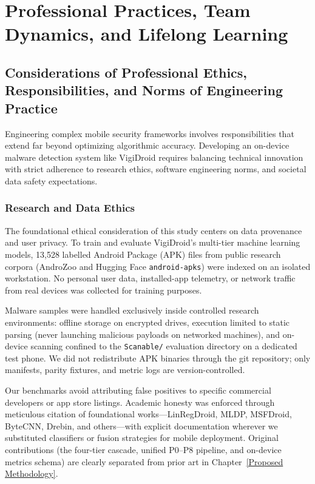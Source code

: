 \chapter{Professional Practices, Team Dynamics, and Lifelong Learning}\label{Ethics}

\section{Considerations of Professional Ethics, Responsibilities, and Norms of Engineering Practice}
Engineering complex mobile security frameworks involves responsibilities that extend far beyond optimizing algorithmic accuracy. Developing an on-device malware detection system like VigiDroid requires balancing technical innovation with strict adherence to research ethics, software engineering norms, and societal data safety expectations.

\subsection{Research and Data Ethics}
The foundational ethical consideration of this study centers on data provenance and user privacy. To train and evaluate VigiDroid's multi-tier machine learning models, 13,528 labelled Android Package (APK) files from public research corpora (AndroZoo and Hugging Face \texttt{android-apks}) were indexed on an isolated workstation. No personal user data, installed-app telemetry, or network traffic from real devices was collected for training purposes.

Malware samples were handled exclusively inside controlled research environments: offline storage on encrypted drives, execution limited to static parsing (never launching malicious payloads on networked machines), and on-device scanning confined to the \texttt{Scanable/} evaluation directory on a dedicated test phone. We did not redistribute APK binaries through the git repository; only manifests, parity fixtures, and metric logs are version-controlled.

Our benchmarks avoid attributing false positives to specific commercial developers or app store listings. Academic honesty was enforced through meticulous citation of foundational works---LinRegDroid, MLDP, MSFDroid, ByteCNN, Drebin, and others---with explicit documentation wherever we substituted classifiers or fusion strategies for mobile deployment. Original contributions (the four-tier cascade, unified P0--P8 pipeline, and on-device metrics schema) are clearly separated from prior art in Chapter~\ref{Proposed Methodology}.

